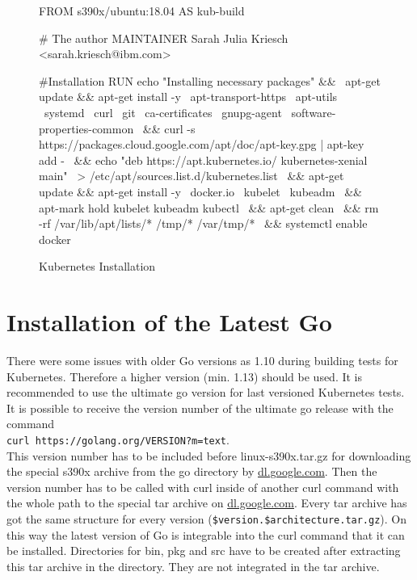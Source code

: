 \begin{figure}[H]
\centering
\begin{boxedverbatim}
FROM s390x/ubuntu:18.04 AS kub-build
 
# The author
MAINTAINER Sarah Julia Kriesch <sarah.kriesch@ibm.com>

#Installation
RUN echo "Installing necessary packages" && \
apt-get update && apt-get install -y \
apt-transport-https \
apt-utils \
systemd \
curl \
git \
ca-certificates \
gnupg-agent \
software-properties-common \
&& curl -s https://packages.cloud.google.com/apt/doc/apt-key.gpg | apt-key add - \
&& echo "deb https://apt.kubernetes.io/ kubernetes-xenial main" \
> /etc/apt/sources.list.d/kubernetes.list \
&& apt-get update && apt-get install -y \
docker.io \
kubelet \
kubeadm \
&& apt-mark hold kubelet kubeadm kubectl \
&& apt-get clean \
&& rm -rf /var/lib/apt/lists/* /tmp/* /var/tmp/* \
&& systemctl enable docker 
\end{boxedverbatim}
 \caption{Kubernetes Installation}
    \label{kubernetes-installation}
\end{figure}

\section{Installation of the Latest Go}

There were some issues with older Go versions as 1.10 during building tests for Kubernetes. Therefore a higher version (min. 1.13) should be used. It is recommended to use the ultimate go version for last versioned Kubernetes tests. It is possible to receive the version number of the ultimate go release with the command \\ 
\lstinline!curl https://golang.org/VERSION?m=text!. \\ 
This version number has to be included before linux-s390x.tar.gz for downloading the special s390x archive from the go directory by \url{dl.google.com}. Then the version number has to be called with curl inside of another curl command with the whole path to the special tar archive on \url{dl.google.com}. Every tar archive has got the same structure for every version (\lstinline!$version.$architecture.tar.gz!). On this way the latest version of Go is integrable into the curl command that it can be installed. Directories for bin, pkg and src have to be created after extracting this tar archive in the  directory. They are not integrated in the tar archive. \\

